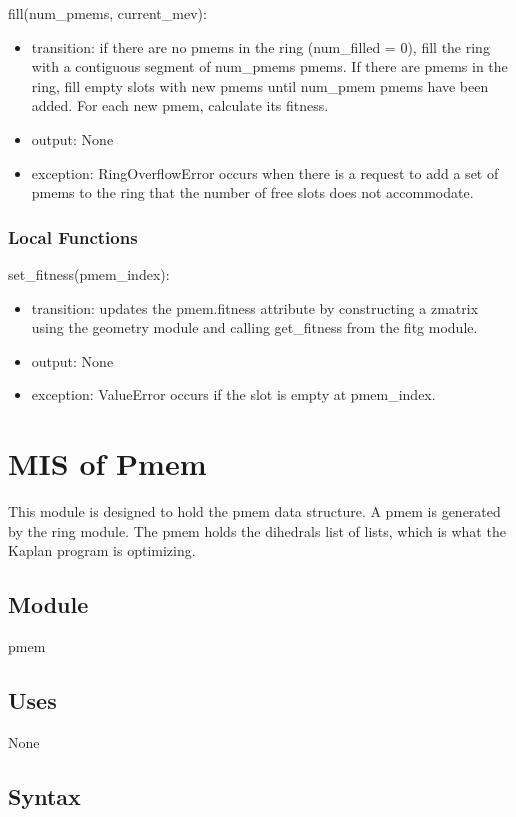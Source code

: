 \documentclass[12pt, titlepage]{article}
\newcommand{\progname}{Kaplan}
\begin{document}
\noindent fill(num\_pmems, current\_mev):
\begin{itemize}
	\item transition: if there are no pmems in the ring (num\_filled = 0), fill 
	the ring with a contiguous segment of num\_pmems pmems. If there are pmems 
	in the ring, fill empty slots with new pmems until num\_pmem pmems have 
	been added. For each new pmem, calculate its fitness.
	\item output: None
	\item exception: RingOverflowError occurs when there is a request to add a 
	set of pmems to the ring that the number of free slots does not accommodate.
\end{itemize}

\subsubsection{Local Functions}

\noindent set\_fitness(pmem\_index):
\begin{itemize}
	\item transition: updates the pmem.fitness attribute by constructing a 
	zmatrix using the geometry module and calling get\_fitness from the fitg 
	module.
	\item output: None
	\item exception: ValueError occurs if the slot is empty at pmem\_index.
\end{itemize}

\section{MIS of Pmem} \label{section-pmem} %

This module is designed to hold the pmem data structure. A pmem is generated by 
the ring module. The pmem holds the dihedrals list of lists, which is what the 
\progname{} program is optimizing.

\subsection{Module}

pmem

\subsection{Uses}

None

\subsection{Syntax}
\end{document}
